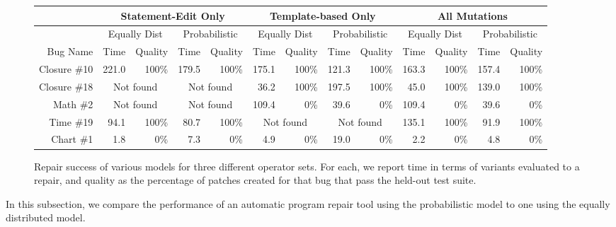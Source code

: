 \documentclass[conference]{IEEEtran}
\begin{document}
\begin{figure}\centering
\begin{tabular}{r|rr|rr|rr|rr|rr|rr}
\hline
 &\multicolumn{4}{c|}{Statement-Edit Only} & \multicolumn{4}{c|}{Template-based Only} & \multicolumn{4}{c}{All Mutations} \\ 
  \hline
 & \multicolumn{2}{c|}{Equally Dist} & \multicolumn{2}{c|}{Probabilistic} & \multicolumn{2}{c|}{Equally Dist} & \multicolumn{2}{c|}{Probabilistic} & \multicolumn{2}{c|}{Equally Dist} & 
 \multicolumn{2}{c}{Probabilistic} \\
\hline
Bug Name & Time & Quality &  Time & Quality &  Time & Quality&  Time & Quality&  Time & Quality&  Time & Quality \\
  \hline
 
  Closure \#10 & {221.0}& {100\%} & {179.5} &{100\%} & {175.1}&{100\%} & {121.3}&{100\%} & {163.3}&{100\%} & {157.4}&{100\%} \\

 Closure \#18 & \multicolumn{2}{c|}{Not found} & \multicolumn{2}{c|}{Not found} & {36.2}&{100\%} & {197.5}&{100\%} & {45.0}&{100\%} & {139.0}&{100\%} \\

Math \#2 & \multicolumn{2}{c|}{Not found} & \multicolumn{2}{c|}{Not found} & {109.4}&{0\%} & {39.6}&{0\%} & {109.4}&{0\%} & {39.6}&{0\%} \\

 Time \#19 & {94.1}&{100\%} & {80.7}&{100\%} & \multicolumn{2}{c|}{Not found} & \multicolumn{2}{c|}{Not found} & {135.1}&{100\%} & {91.9}&{100\%} \\

 Chart \#1 & {1.8}&{0\%} & {7.3}&{0\%} & {4.9}&{0\%} & {19.0}&{0\%} & {2.2}&{0\%} & {4.8}&{0\%} \\
\hline

\end{tabular}
\newline
\center
		\caption{Repair success of various models for three different operator
          sets.  For each, we report time in terms of variants evaluated to a
          repair, and quality as the percentage of patches created for that bug that pass the held-out test suite. \label{tab:singleLineBugs}}

\end{figure}

In this subsection, we compare the performance of an
automatic program repair tool using the probabilistic model to one using the
equally distributed model.  
\end{document}
